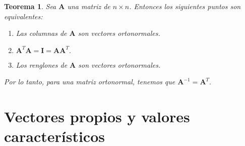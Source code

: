 \documentclass[11pt]{report}
\theoremstyle{break}
\newtheorem{teorema}{Teorema}[chapter]
\theoremstyle{break}
\newcommand{\matdim}[2]{$#1 \times #2$}
\begin{document}
\begin{teorema}
Sea $\bm{A}$ una matriz de \matdim{n}{n}. Entonces los siguientes puntos son equivalentes:

\begin{enumerate}[label=\roman*)]
\item Las columnas de $\bm{A}$ son vectores ortonormales.
\item $\bm{A}^{T} \bm{A} = \bm{I} = \bm{A} \bm{A}^{T}.$
\item Los renglones de $\bm{A}$ son vectores ortonormales.
\end{enumerate}

Por lo tanto, para una matriz ortonormal, tenemos que $\bm{A}^{-1} = \bm{A}^{T}.$
\end{teorema}

\chapter{Vectores propios y valores característicos}
\label{chapter:eigen}
\end{document}
